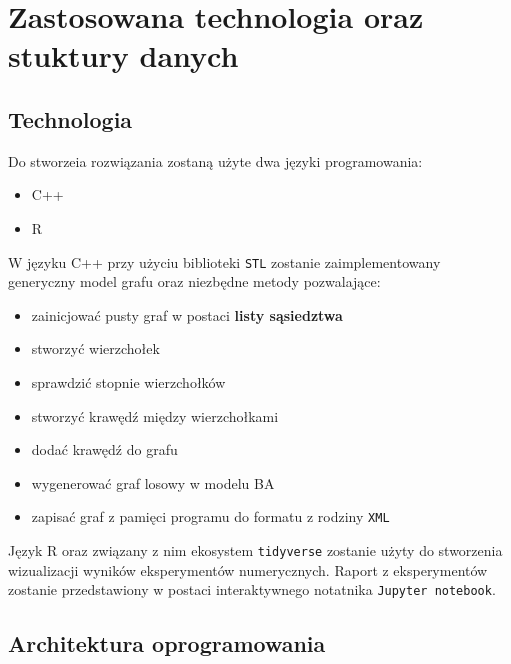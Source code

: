 \documentclass{article}
\begin{document}
\section{Zastosowana technologia oraz stuktury danych \label{s5}}
\subsection{Technologia}
	Do stworzeia rozwiązania zostaną użyte dwa języki programowania:
		\begin{itemize}
			\item C++
			\item R
		\end{itemize}
		W języku C++ przy użyciu biblioteki \texttt{STL} zostanie zaimplementowany generyczny model grafu oraz niezbędne metody pozwalające: 
		\begin{itemize}
			\item zainicjować pusty graf w postaci \textbf{listy sąsiedztwa}
			\item stworzyć wierzchołek
			\item sprawdzić stopnie wierzchołków
			\item stworzyć krawędź między wierzchołkami
			\item dodać krawędź do grafu
			\item wygenerować graf losowy w modelu BA
			\item zapisać graf z pamięci programu do formatu z rodziny \texttt{XML}
		\end{itemize}
	Język R oraz związany z nim ekosystem \texttt{tidyverse} zostanie użyty do 
	stworzenia wizualizacji wyników eksperymentów numerycznych. Raport z eksperymentów zostanie
	przedstawiony w postaci interaktywnego notatnika \texttt{Jupyter notebook}.
\subsection{Architektura oprogramowania}
\end{document}
